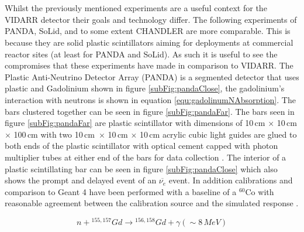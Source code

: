 \\\\Whilst the previously mentioned experiments are a useful context for the VIDARR detector their goals and technology differ. The following experiments of PANDA, SoLid, and to some extent CHANDLER are more comparable. This is because they are solid plastic scintillators aiming for deployments at commercial reactor sites (at least for PANDA and SoLid). As such it is useful to see the compromises that these experiments have made in comparison to VIDARR. The Plastic Anti-Neutrino Detector Array (PANDA) is a segmented detector that uses plastic and Gadolinium shown in figure \ref{subFig:pandaClose}, the gadolinium's interaction with neutrons is shown in equation \ref{equ:gadolinumNAbsorption}. The bars clustered together can be seen in figure \ref{subFig:pandaFar}. The bars seen in figure \ref{subFig:pandaFar} are plastic scintillator with dimensions of 10\,cm $\times$ 10\,cm $\times$ 100\,cm with two 10\,cm\ $\times$ 10\,cm $\times$ 10\,cm acrylic cubic light guides are glued to both ends of the plastic scintillator with optical cement capped with photon multiplier tubes at either end of the bars for data collection \cite{PANDA_2014}. The interior of a plastic scintillating bar can be seen in figure \ref{subFig:pandaClose} which also shows the prompt and delayed event of an $\overline{\nu_e}$ event. In addition calibrations and comparison to Geant 4 \cite{Agostinelli:2002hh} have been performed with a baseline of a $^{60}$Co with reasonable agreement between the calibration source and the simulated response \cite{PANDA_2012}. 

\begin{equation}
n + {^{155,157}Gd} \rightarrow {^{156,158} Gd} + \gamma (\sim 8\,MeV)
\label{equ:gadolinumNAbsorption}
\end{equation}

